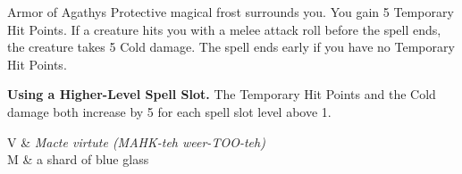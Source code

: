 \begin{Spell}[
  level=1st,
  time=1 Bonus Action,
  range=Self,
  components={V, S, M},
  duration=1 Hour,
  school=Abjuration,
  attack=None,
  effect=Cold
]{Armor of Agathys}
Protective magical frost surrounds you. You gain 5 Temporary Hit Points. If a creature hits you with a melee attack roll before the spell ends, the creature takes 5 Cold damage. The spell ends early if you have no Temporary Hit Points.

\textbf{Using a Higher-Level Spell Slot.} The Temporary Hit Points and the Cold damage both increase by 5 for each spell slot level above 1.

\begin{components}
V & \textit{Macte virtute (MAHK-teh weer-TOO-teh)} \\
M & a shard of blue glass
\end{components}
\end{Spell}


